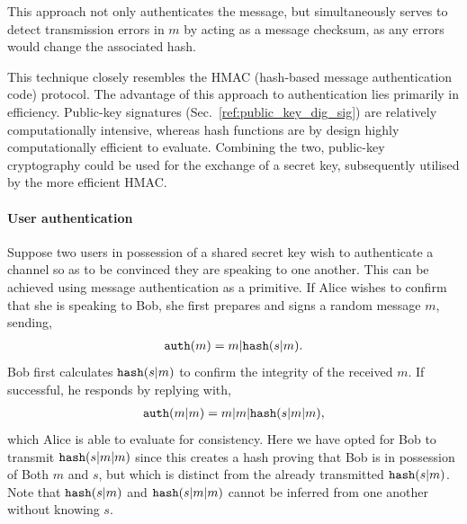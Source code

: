 This approach not only authenticates the message, but simultaneously serves to detect transmission errors in $m$ by acting as a message checksum, as any errors would change the associated hash.

This technique closely resembles the HMAC (hash-based message authentication code) protocol. The advantage of this approach to authentication lies primarily in efficiency. Public-key signatures (Sec.~\ref{ref:public_key_dig_sig}) are relatively computationally intensive, whereas hash functions are by design highly computationally efficient to evaluate. Combining the two, public-key cryptography could be used for the exchange of a secret key, subsequently utilised by the more efficient HMAC.

\paragraph{User authentication}

Suppose two users in possession of a shared secret key wish to authenticate a channel so as to be convinced they are speaking to one another. This can be achieved using message authentication as a primitive. If Alice wishes to confirm that she is speaking to Bob, she first prepares and signs a random message $m$, sending,
\begin{align}
	{\tt auth}(m) = m|{\tt hash}(s|m).
\end{align}
Bob first calculates ${\tt hash}(s|m)$ to confirm the integrity of the received $m$. If successful, he responds by replying with,
\begin{align}
	{\tt auth}(m|m) = m|m|{\tt hash}(s|m|m),
\end{align}
which Alice is able to evaluate for consistency. Here we have opted for Bob to transmit ${\tt hash}(s|m|m)$ since this creates a hash proving that Bob is in possession of Both $m$ and $s$, but which is distinct from the already transmitted ${\tt hash}(s|m)$. Note that ${\tt hash}(s|m)$ and ${\tt hash}(s|m|m)$ cannot be inferred from one another without knowing $s$.


